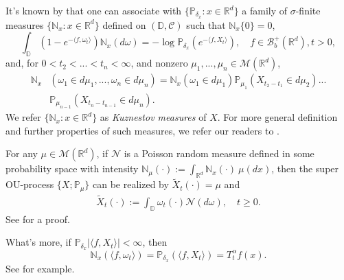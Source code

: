 \documentclass[12pt, a4paper]{amsart}
\theoremstyle{definition}
\numberwithin{equation}{section}
\begin{document}
It's known by \cite[section 8.4]{Li2011Measure} that  one can associate with $\{\mathbb{P}_{\delta_x}:x\in\mathbb{R}^d\}$ a family of $\sigma$-finite measures $\{\mathbb{N}_x:x \in \mathbb{R}^d\}$ defined on $(\mathbb{D},\mathcal{C})$ such that $\mathbb{N}_x\{0\}=0$, 
\begin{equation}\label{Nmeasure}
   \int_{\mathbb{D}}(1-e^{-\langle f,\omega_t\rangle})\mathbb{N}_x(d\omega)=-\log \mathbb{P}_{\delta_x}(e^{-\langle f, X_t \rangle}), \quad f \in \mathcal{B}_b^+(\mathbb{R}^d), t>0,
\end{equation}
and, for $0<t_2<...<t_n<\infty$, and nonzero $\mu_1,...,\mu_n \in \mathcal{M}(\mathbb{R}^d)$,
\begin{align*}
    \mathbb{N}_x&\left(\omega_1\in d \mu_1,...,\omega_n \in d\mu_n\right)=\mathbb{N}_x(\omega_1\in d\mu_1)\mathbb{P}_{\mu_1}\left(X_{t_2-t_1}\in d \mu_2\right)...\\
    &\mathbb{P}_{\mu_{n-1}}\left(X_{t_n-t_{n-1}}\in d \mu_n\right).
\end{align*}
We refer $\{\mathbb{N}_x:x \in \mathbb{R}^d\}$ as {\em Kuznestov measures} of $X$. For more general definition and further properties of such measures, we refer our readers to \cite{ZL,DK}.

For any $\mu \in \mathcal{M}(\mathbb{R}^d)$, if $\mathcal{N}$ is a Poisson random measure defined in some probability space with intensity $\mathbb{N}_{\mu}(\cdot):=\int_{\mathbb{R}^d}\mathbb{N}_x(\cdot)~\mu(dx)$, then the super OU-process $\{X;\mathbb{P}_{\mu}\}$ can be realized by $\tilde{X}_t(\cdot)=\mu$ and
\begin{align*}
    \tilde{X}_t(\cdot):=\int_{\mathbb{D}}\omega_t(\cdot)\mathcal{N}(d\omega), \quad t\geq 0.
\end{align*}
See \cite[Theorem 8.24]{Li2011Measure} for a proof.

What's more, if $\mathbb{P}_{\delta_x}|\langle f, X_t\rangle|<\infty$, then
\begin{equation}\label{Nmean}
    \mathbb{N}_x(\langle f,\omega_t \rangle) = \mathbb{P}_{\delta_x}(\langle f, X_t\rangle)=T^{\alpha}_t f(x).
\end{equation}
See \cite[Lemma 3.3]{RenSongSun2017Spine} for example.
\end{document}
